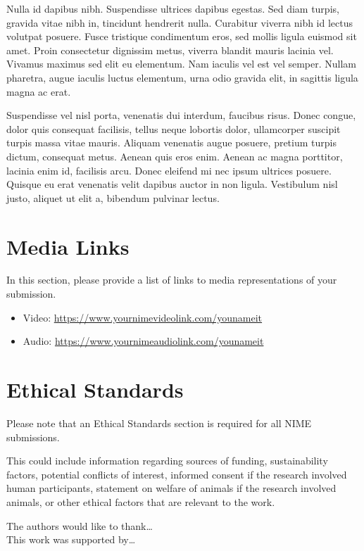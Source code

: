 \documentclass[acmsmall]{nimeart}
\begin{document}
Nulla id dapibus nibh. Suspendisse ultrices dapibus egestas. Sed diam turpis, gravida vitae nibh in, tincidunt hendrerit nulla. Curabitur viverra nibh id lectus volutpat posuere. Fusce tristique condimentum eros, sed mollis ligula euismod sit amet. Proin consectetur dignissim metus, viverra blandit mauris lacinia vel. Vivamus maximus sed elit eu elementum. Nam iaculis vel est vel semper. Nullam pharetra, augue iaculis luctus elementum, urna odio gravida elit, in sagittis ligula magna ac erat.

Suspendisse vel nisl porta, venenatis dui interdum, faucibus risus. Donec congue, dolor quis consequat facilisis, tellus neque lobortis dolor, ullamcorper suscipit turpis massa vitae mauris. Aliquam venenatis augue posuere, pretium turpis dictum, consequat metus. Aenean quis eros enim. Aenean ac magna porttitor, lacinia enim id, facilisis arcu. Donec eleifend mi nec ipsum ultrices posuere. Quisque eu erat venenatis velit dapibus auctor in non ligula. Vestibulum nisl justo, aliquet ut elit a, bibendum pulvinar lectus.

\section{Media Links}

In this section, please provide a list of links to media representations of your submission.

\begin{itemize}
	\item Video: \url{https://www.yournimevideolink.com/younameit}
	\item Audio: \url{https://www.yournimeaudiolink.com/younameit}
\end{itemize}

\section{Ethical Standards}

Please note that an Ethical Standards section is required for all NIME submissions.

This could include information regarding sources of funding, sustainability factors, potential conflicts of interest,  informed consent if the research involved human participants, statement on welfare of animals if the research involved animals, or other ethical factors that are relevant to the work.

\begin{acks}
The authors would like to thank\ldots
\\
This work was supported by\ldots
\end{acks}



\end{document}
